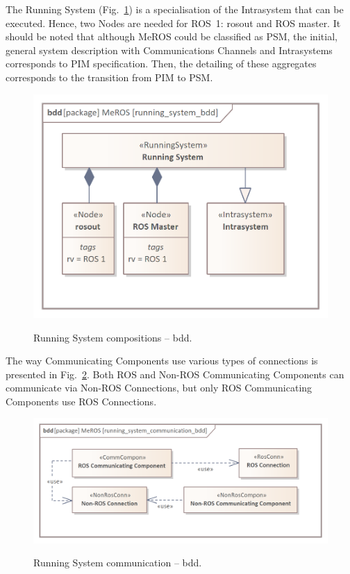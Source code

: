 \documentclass[11pt,oneside,a4paper]{article}
\begin{document}
  	The Running System (Fig.~\ref{fig:running_system_bdd}) is a specialisation of the Intrasystem that can be executed. Hence, two Nodes are needed for ROS~1: rosout and ROS master. 
	It should be noted that although MeROS could be classified as PSM, the initial, general system description with Communications Channels and Intrasystems corresponds to PIM specification. Then, the detailing of these aggregates corresponds to the transition from PIM to PSM. 
	
		
	\begin{figure}[H]
		\centering
		\begin{center}
			{\includegraphics[scale=1.0]{img/meros_pkg/running_system_bdd.png}}
		\end{center}
		\caption{Running System compositions -- bdd.} 
		\label{fig:running_system_bdd}
	\end{figure}
	
	\pagebreak
	
	The way Communicating Components use various types of connections is presented in Fig.~\ref{fig:running_system_communication_bdd}. Both ROS and Non-ROS Communicating Components can communicate via Non-ROS Connections, but only ROS Communicating Components use ROS Connections.


	\begin{figure}[H]
		\centering
		\begin{center}
			{\includegraphics[scale=1.0]{img/meros_pkg/running_system_communication_bdd.png}}
		\end{center}
		\caption{Running System communication -- bdd.} 
		\label{fig:running_system_communication_bdd}
	\end{figure}
\end{document}
